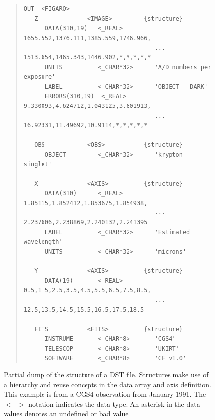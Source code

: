 \documentclass[final,authoryear,5p,times,twocolumn]{elsarticle}
\begin{document}
\begin{figure}[t]
\begin{minipage}{\textwidth}
\begin{quote}
\small
\begin{verbatim}
OUT  <FIGARO>
   Z              <IMAGE>         {structure}
      DATA(310,19)   <_REAL>         1655.552,1376.111,1385.559,1746.966,
                                     ... 1513.654,1465.343,1446.902,*,*,*,*,*
      UNITS          <_CHAR*32>      'A/D numbers per exposure'
      LABEL          <_CHAR*32>      'OBJECT - DARK'
      ERRORS(310,19)  <_REAL>        9.330093,4.624712,1.043125,3.801913,
                                     ... 16.92331,11.49692,10.9114,*,*,*,*,*

   OBS            <OBS>           {structure}
      OBJECT         <_CHAR*32>      'krypton singlet'

   X              <AXIS>          {structure}
      DATA(310)      <_REAL>         1.85115,1.852412,1.853675,1.854938,
                                     ... 2.237606,2.238869,2.240132,2.241395
      LABEL          <_CHAR*32>      'Estimated wavelength'
      UNITS          <_CHAR*32>      'microns'

   Y              <AXIS>          {structure}
      DATA(19)       <_REAL>         0.5,1.5,2.5,3.5,4.5,5.5,6.5,7.5,8.5,
                                     ... 12.5,13.5,14.5,15.5,16.5,17.5,18.5

   FITS           <FITS>          {structure}
      INSTRUME       <_CHAR*8>       'CGS4'
      TELESCOP       <_CHAR*8>       'UKIRT'
      SOFTWARE       <_CHAR*8>       'CF v1.0'
\end{verbatim}
\end{quote}
\caption{Partial dump of the structure of a DST file. Structures make
  use of a hierarchy and reuse concepts in the data array and axis
  definition. This example is from a CGS4 observation from January
  1991. The \texttt{$<$~$>$} notation indicates the data type.  An
  asterisk in the data values denotes an undefined or bad value.}
\label{fig:dst}
\end{minipage}
\end{figure}
\end{document}

